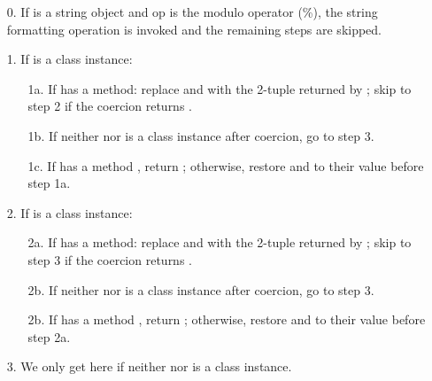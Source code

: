 \begin{itemize}

\item[0.] If  is a string object and op is the modulo operator (\%),
the string formatting operation is invoked and the remaining steps are
skipped.

\item[1.] If  is a class instance:

	\begin{itemize}

	\item[1a.] If  has a  method:
	replace  and  with the 2-tuple returned by
	; skip to step 2 if the
	coercion returns .

	\item[1b.] If neither  nor  is a class instance
	after coercion, go to step 3.

	\item[1c.] If  has a method , return
	; otherwise, restore  and
	 to their value before step 1a.

	\end{itemize}

\item[2.] If  is a class instance:

	\begin{itemize}

	\item[2a.] If  has a  method:
	replace  and  with the 2-tuple returned by
	; skip to step 3 if the
	coercion returns .

	\item[2b.] If neither  nor  is a class instance
	after coercion, go to step 3.

	\item[2b.] If  has a method , return
	; otherwise, restore 
	and  to their value before step 2a.

	\end{itemize}

\item[3.] We only get here if neither  nor  is a class
instance.

	\begin{itemize}


\end{itemize}
\end{itemize}
